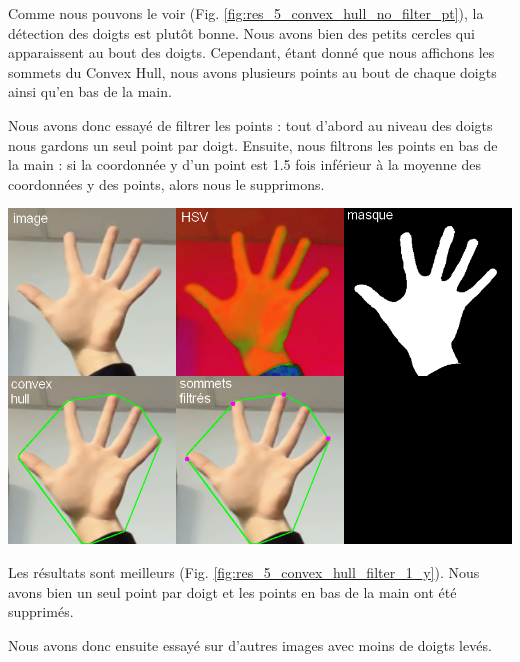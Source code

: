\documentclass[11pt]{article}
\begin{document}
Comme nous pouvons le voir (Fig. \ref{fig:res_5_convex_hull_no_filter_pt}), la détection des doigts est plutôt bonne. Nous avons bien des petits cercles qui apparaissent au bout des doigts. Cependant, étant donné que nous affichons les sommets du Convex Hull, nous avons plusieurs points au bout de chaque doigts ainsi qu'en bas de la main. \bigbreak

Nous avons donc essayé de filtrer les points : tout d'abord au niveau des doigts nous gardons un seul point par doigt. Ensuite, nous filtrons les points en bas de la main : si la coordonnée y d'un point est 1.5 fois inférieur à la moyenne des coordonnées y des points, alors nous le supprimons. \bigbreak

\begin{center}
    \includegraphics[width=\textwidth]{images/res_5_convex_hull_filter_1_y.png}
    \label{fig:res_5_convex_hull_filter_1_y}
\end{center}

Les résultats sont meilleurs (Fig. \ref{fig:res_5_convex_hull_filter_1_y}). Nous avons bien un seul point par doigt et les points en bas de la main ont été supprimés. \bigbreak

Nous avons donc ensuite essayé sur d'autres images avec moins de doigts levés. \bigbreak
\end{document}
